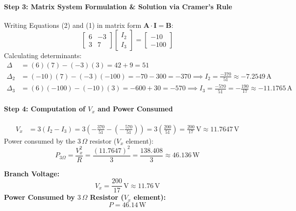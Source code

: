 \documentclass[11pt,a4paper,oneside]{article}
\begin{document}
\paragraph{Step 3: Matrix System Formulation \& Solution via Cramer's Rule}
Writing Equations (2) and (1) in matrix form $\mathbf{A} \cdot \mathbf{I} = \mathbf{B}$:
\begin{equation}
\begin{bmatrix}
6 & -3 \\
3 & 7
\end{bmatrix}
\begin{bmatrix}
I_2 \\ I_3
\end{bmatrix}
=
\begin{bmatrix}
-10 \\ -100
\end{bmatrix}
\end{equation}
Calculating determinants:
\begin{align*}
\Delta &= (6)(7) - (-3)(3) = 42 + 9 = 51 \\
\Delta_2 &= (-10)(7) - (-3)(-100) = -70 - 300 = -370 \implies I_2 = \frac{-370}{51} \approx -7.2549\,\mathrm{A} \\
\Delta_3 &= (6)(-100) - (-10)(3) = -600 + 30 = -570 \implies I_3 = \frac{-570}{51} = -\frac{190}{17} \approx -11.1765\,\mathrm{A}
\end{align*}

\paragraph{Step 4: Computation of $V_x$ and Power Consumed}
\begin{align*}
  V_x &= 3(I_2 - I_3) = 3\left(-\frac{370}{51} - \left(-\frac{570}{51}\right)\right) = 3\left(\frac{200}{51}\right) = \frac{200}{17}\,\mathrm{V} \approx 11.7647\,\mathrm{V}
\end{align*}
Power consumed by the $3\,\Omega$ resistor ($V_x$ element):
\begin{equation}
  P_{3\Omega} = \frac{V_x^2}{R} = \frac{(11.7647)^2}{3} = \frac{138.408}{3} \approx 46.136\,\mathrm{W}
\end{equation}

\begin{answerbox}
\textbf{Branch Voltage:}
\[
V_x = \frac{200}{17}\,\mathrm{V} \approx 11.76\,\mathrm{V}
\]
\textbf{Power Consumed by $3\,\Omega$ Resistor ($V_x$ element):}
\[
P = 46.14\,\mathrm{W}
\]
\end{answerbox}
\end{document}
